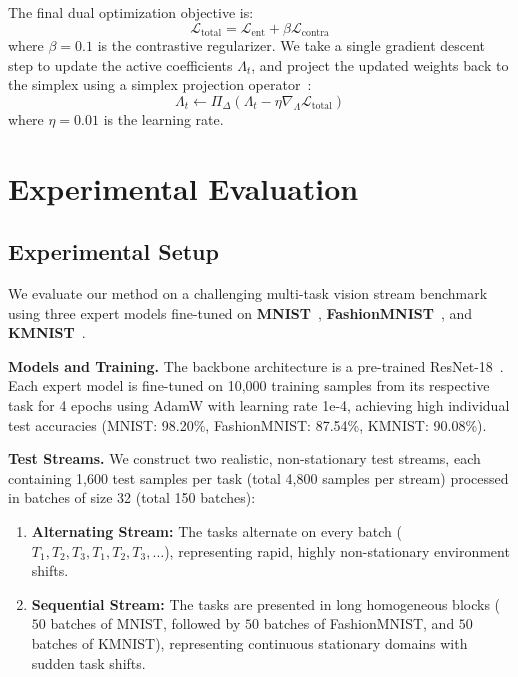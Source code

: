 \documentclass{article}
\theoremstyle{plain}
\theoremstyle{definition}
\theoremstyle{remark}
\begin{document}
The final dual optimization objective is:
\begin{equation}
    \mathcal{L}_{\text{total}} = \mathcal{L}_{\text{ent}} + \beta \mathcal{L}_{\text{contra}}
\end{equation}
where $\beta = 0.1$ is the contrastive regularizer. We take a single gradient descent step to update the active coefficients $\Lambda_t$, and project the updated weights back to the simplex using a simplex projection operator~\cite{yang2024adamerging}:
\begin{equation}
    \Lambda_t \leftarrow \Pi_{\Delta} \left( \Lambda_t - \eta \nabla_{\Lambda} \mathcal{L}_{\text{total}} \right)
\end{equation}
where $\eta = 0.01$ is the learning rate.

\section{Experimental Evaluation}
\label{submission-experiments}

\subsection{Experimental Setup}
We evaluate our method on a challenging multi-task vision stream benchmark using three expert models fine-tuned on \textbf{MNIST}~\cite{mnist}, \textbf{FashionMNIST}~\cite{fashionmnist}, and \textbf{KMNIST}~\cite{kmnist}.

\textbf{Models and Training.} The backbone architecture is a pre-trained ResNet-18~\cite{he2016resnet}. Each expert model is fine-tuned on 10,000 training samples from its respective task for 4 epochs using AdamW with learning rate 1e-4, achieving high individual test accuracies (MNIST: 98.20\%, FashionMNIST: 87.54\%, KMNIST: 90.08\%).

\textbf{Test Streams.} We construct two realistic, non-stationary test streams, each containing 1,600 test samples per task (total 4,800 samples per stream) processed in batches of size 32 (total 150 batches):
\begin{enumerate}
    \item \textbf{Alternating Stream:} The tasks alternate on every batch ($T_1, T_2, T_3, T_1, T_2, T_3, \dots$), representing rapid, highly non-stationary environment shifts.
    \item \textbf{Sequential Stream:} The tasks are presented in long homogeneous blocks ($50$ batches of MNIST, followed by $50$ batches of FashionMNIST, and $50$ batches of KMNIST), representing continuous stationary domains with sudden task shifts.
\end{enumerate}
\end{document}
